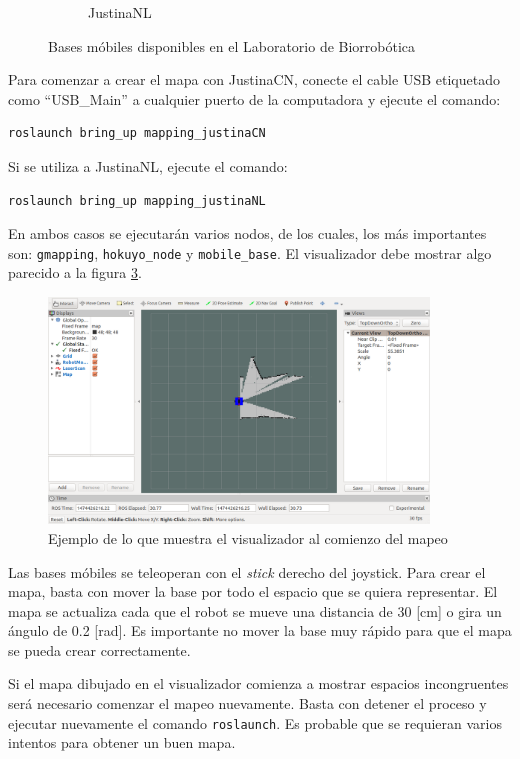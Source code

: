 \documentclass[letterpaper,12pt]{article}
\begin{document}
\begin{figure}
\begin{subfigure}{0.45\textwidth}
  \caption{JustinaNL}
  \label{fig:JustinaNL}
\end{subfigure}
\caption{Bases móbiles disponibles en el Laboratorio de Biorrobótica}
\end{figure}

Para comenzar a crear el mapa con JustinaCN, conecte el cable USB etiquetado como ``USB_Main'' a cualquier puerto de la computadora y ejecute el comando:
\begin{verbatim}
roslaunch bring_up mapping_justinaCN
\end{verbatim}

Si se utiliza a JustinaNL, ejecute el comando:
\begin{verbatim}
roslaunch bring_up mapping_justinaNL
\end{verbatim}

En ambos casos se ejecutarán varios nodos, de los cuales, los más importantes son: \texttt{gmapping}, \texttt{hokuyo\_node} y \texttt{mobile\_base}. El visualizador debe mostrar algo parecido a la figura \ref{fig:rviz}.

\begin{figure}
\centering
\includegraphics[width=0.9\textwidth]{Figures/rviz_mapping.png}
\caption{Ejemplo de lo que  muestra el visualizador al comienzo del mapeo}
\label{fig:rviz}
\end{figure}

Las bases móbiles se teleoperan con el \textit{stick} derecho del joystick. Para crear el mapa, basta con mover la base por todo el espacio que se quiera representar. El mapa se actualiza cada que el robot se mueve una distancia de 30 [cm] o gira un ángulo de 0.2 [rad]. Es importante no mover la base muy rápido para que el mapa se pueda crear correctamente. 

Si el mapa dibujado en el visualizador comienza a mostrar espacios incongruentes será necesario comenzar el mapeo nuevamente. Basta con detener el proceso y ejecutar nuevamente el comando \texttt{roslaunch}. Es probable que se requieran varios intentos para obtener un buen mapa. 
\end{document}
